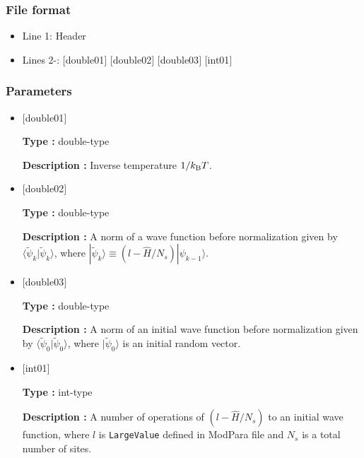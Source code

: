 \subsubsection{File format}
 \begin{itemize}
   \item Line 1: Header
   \item Lines 2-: $[$double01$]$ $[$double02$]$ $[$double03$]$ $[$int01$]$
  \end{itemize}
\subsubsection{Parameters}
 \begin{itemize}

  \item  $[$double01$]$
  
 {\bf Type :} double-type

{\bf Description :}  Inverse temperature $1/{k_{\rm B}T}$.
 
  \item $[$double02$]$

 {\bf Type :} double-type 

{\bf Description :}  A norm of a wave function before normalization 
given by $\langle \tilde{\psi}_{k} |\tilde{\psi}_{k}\rangle$, where $|\tilde{\psi}_{k}\rangle \equiv(l-\hat{H}/N_{s})|\psi_{k-1}\rangle$.


  \item $[$double03$]$

 {\bf Type :} double-type 

{\bf Description :} A norm of an initial wave function before normalization 
given by $\langle \tilde{\psi}_{0} |\tilde{\psi}_{0}\rangle$, where $|\tilde{\psi}_{0}\rangle$ is an initial random vector.

  \item $[$int01$]$

 {\bf Type :} int-type 

{\bf Description :} A number of operations of $(l-\hat{H}/N_{s})$ to an initial wave function, where $l$ is \verb|LargeValue| defined in ModPara file and $N_{s}$ is a total number of sites.

 \end{itemize}


\newpage

